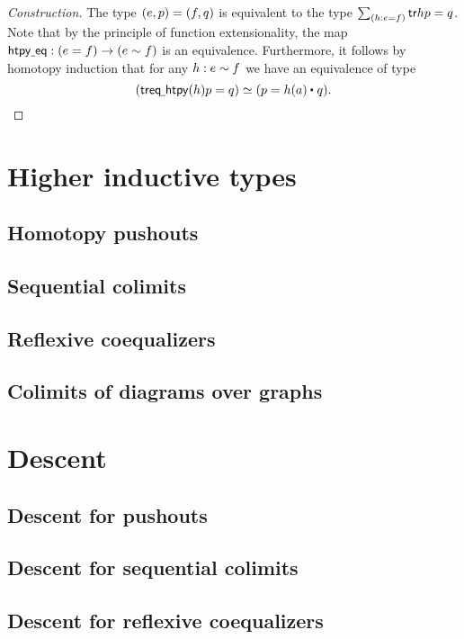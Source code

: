 \begin{proof}[Construction]
The type ${\mathopen{}(e,p)\mathclose{}}={\mathopen{}(f,q)\mathclose{}}$ is equivalent
to the type $\sm{h:e=f}\tr{}{h}{p}=q$.
Note that by the principle of function extensionality,
the map $\mathsf{htpy\underline{\ }{}eq}:(e=f)\to(e\sim f)$
is an equivalence. Furthermore, it follows by homotopy induction that for any 
$h:e\sim f$ we have an equivalence of type
\begin{equation*}
\eqv{(\tr{}{\eqhtpy(h)}{p}=q)}
    {(p= \ct{h(a)}{q})}.\qedhere
\end{equation*}
\end{proof}

\section{Higher inductive types}
\subsection{Homotopy pushouts}

\subsection{Sequential colimits}

\subsection{Reflexive coequalizers}

\subsection{Colimits of diagrams over graphs}

\section{Descent}

\subsection{Descent for pushouts}

\subsection{Descent for sequential colimits}

\subsection{Descent for reflexive coequalizers}

